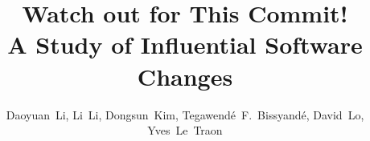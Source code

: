 \documentclass[times]{smrauth}
\begin{document}

\title{Watch out for This Commit!\\ A Study of Influential Software Changes}


\author{Daoyuan~Li, Li~Li, Dongsun~Kim, Tegawend\'e~F.~Bissyand\'e, David~Lo, Yves~Le~Traon}

\address{University of Luxembourg\break {}Singapore Management University}


\end{document}
